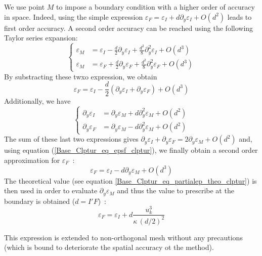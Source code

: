 We use point $M$ to impose a boundary condition with a higher order of
accuracy in space.
 Indeed, using the simple expression
$\varepsilon_F=\varepsilon_I+d\partial_y\varepsilon_I + O(d^2)$ leads to
first order accuracy.
 A second order accuracy can be reached
 using the following Taylor series expansion:
\begin{equation}
\left\{\begin{array}{ll}
\varepsilon_M&=\varepsilon_I-\displaystyle\frac{d}{2}\partial_y\varepsilon_I+\displaystyle\frac{d^2}{8}\partial^2_y\varepsilon_I+O(d^3)\\
\varepsilon_M&=\varepsilon_F+\displaystyle\frac{d}{2}\partial_y\varepsilon_F+\displaystyle\frac{d^2}{8}\partial^2_y\varepsilon_F+O(d^3)
\end{array}\right.
\end{equation}
By substracting these twxo expression, we obtain
\begin{equation}\label{Base_Clptur_eq_epsf_clptur}
\varepsilon_F=\varepsilon_I-\displaystyle\frac{d}{2}(\partial_y\varepsilon_I+\partial_y\varepsilon_F)+O(d^3)
\end{equation}
Additionally, we have
\begin{equation}
\left\{\begin{array}{ll}
\partial_y\varepsilon_I&=\partial_y\varepsilon_M+d\partial^2_y\varepsilon_M+O(d^2)\\
\partial_y\varepsilon_F&=\partial_y\varepsilon_M-d\partial^2_y\varepsilon_M+O(d^2)
\end{array}\right.
\end{equation}
The sum of these last two expressions gives
$\partial_y\varepsilon_I+\partial_y\varepsilon_F=2\partial_y\varepsilon_M+O(d^2)$ and,
using equation
(\ref{Base_Clptur_eq_epsf_clptur}), we finally obtain a second order
approximation for $\varepsilon_F$~:
\begin{equation}
\varepsilon_F=\varepsilon_I-d\partial_y\varepsilon_M+O(d^3)
\end{equation}
The theoretical value (see equation \ref{Base_Clptur_eq_partialep_theo_clptur})
is then used in order to evaluate
 $\partial_y\varepsilon_M$ and thus the value to prescribe at
the boundary is obtained ($d=I'F$)~:
\begin{equation}
\varepsilon_F=\varepsilon_I+d\displaystyle\frac{ u_k^3}{\kappa\, (d/2)^2}
\end{equation}

This expression is extended to non-orthogonal mesh without any precautions
(which is bound to deteriorate the spatial accuracy ot the method).

